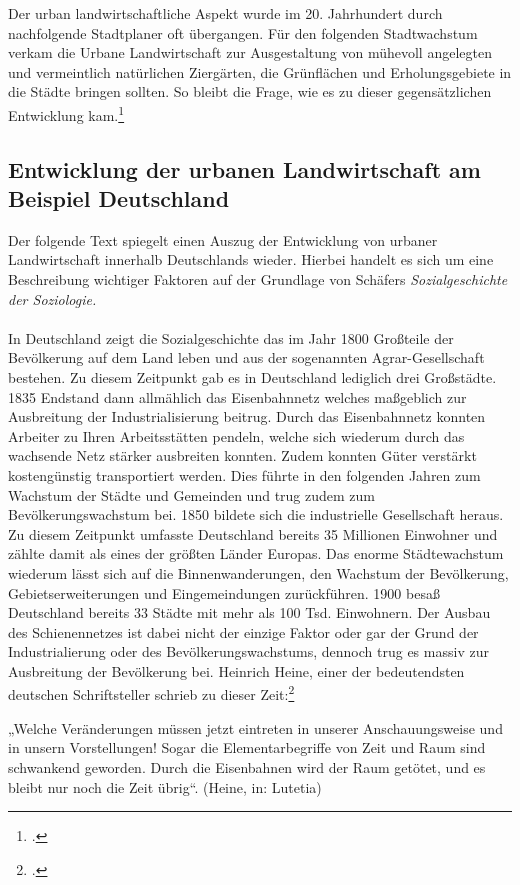 \documentclass{scrartcl}
\begin{document}
Der urban landwirtschaftliche Aspekt wurde im 20. Jahrhundert durch nachfolgende Stadtplaner oft übergangen. Für den folgenden Stadtwachstum verkam die Urbane Landwirtschaft zur Ausgestaltung von mühevoll angelegten und vermeintlich natürlichen Ziergärten, die Grünflächen und Erholungsgebiete in die Städte bringen sollten. So bleibt die Frage, wie es zu dieser gegensätzlichen Entwicklung kam.\footcite[Vgl.][S. 144f]{MullerUrbanStadt}

\subsection{Entwicklung der urbanen Landwirtschaft am Beispiel Deutschland}

Der folgende Text spiegelt einen Auszug der Entwicklung von urbaner Landwirtschaft innerhalb Deutschlands wieder. Hierbei handelt es sich um eine Beschreibung wichtiger Faktoren auf der Grundlage von Schäfers \textit{Sozialgeschichte der Soziologie.}\\
\\
In Deutschland zeigt die Sozialgeschichte das im Jahr 1800 Großteile der Bevölkerung auf dem Land leben und aus der sogenannten Agrar-Gesellschaft bestehen. Zu diesem Zeitpunkt gab es in Deutschland lediglich drei Großstädte. 1835 Endstand dann allmählich das Eisenbahnnetz welches maßgeblich zur Ausbreitung der Industrialisierung beitrug. Durch das Eisenbahnnetz konnten Arbeiter zu Ihren Arbeitsstätten pendeln, welche sich wiederum durch das wachsende Netz stärker ausbreiten konnten. Zudem konnten Güter verstärkt kostengünstig transportiert werden. Dies führte in den folgenden Jahren zum Wachstum der Städte und Gemeinden und trug zudem zum Bevölkerungswachstum bei. 1850 bildete sich die industrielle Gesellschaft heraus. Zu diesem Zeitpunkt umfasste Deutschland bereits 35 Millionen Einwohner und zählte damit als eines der größten Länder Europas. Das enorme Städtewachstum wiederum lässt sich auf die Binnenwanderungen, den Wachstum der Bevölkerung, Gebietserweiterungen und Eingemeindungen zurückführen. 1900 besaß Deutschland bereits 33 Städte mit mehr als 100 Tsd. Einwohnern. Der Ausbau des Schienennetzes ist dabei nicht der einzige Faktor oder gar der Grund der Industrialierung oder des Bevölkerungswachstums, dennoch trug es massiv zur Ausbreitung der Bevölkerung bei. Heinrich Heine, einer der bedeutendsten deutschen Schriftsteller schrieb zu dieser Zeit:\footcite[Vgl.][S. 17-21, 55-57]{Schafers2016SozialgeschichteSoziologie}
\begin{displayquote}
„Welche Veränderungen müssen jetzt eintreten in unserer Anschauungsweise und in unsern Vorstellungen! Sogar die Elementarbegriffe von Zeit und Raum sind schwankend geworden. Durch die Eisenbahnen wird der Raum getötet, und es bleibt nur noch die Zeit übrig“. (Heine, in: Lutetia)
\end{displayquote}
\end{document}
